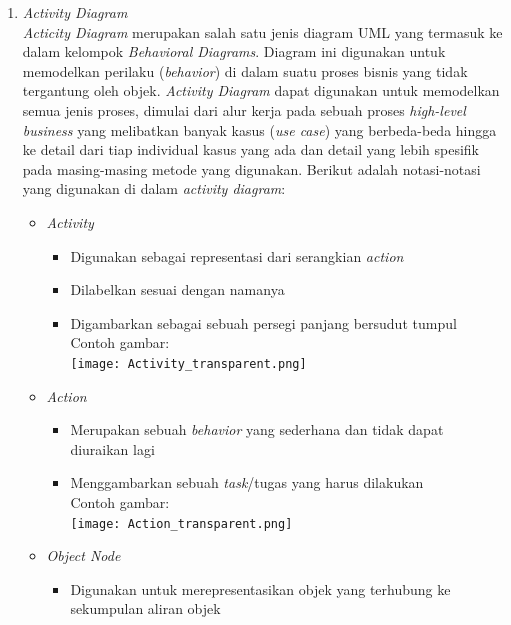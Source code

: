 \documentclass[a4paper]{article}
\begin{document}
\begin{enumerate}
    \item \textit{Activity Diagram}\\
    \textit{Acticity Diagram} merupakan salah satu jenis diagram UML yang termasuk ke dalam kelompok \textit{Behavioral Diagrams}. Diagram ini digunakan untuk memodelkan perilaku (\textit{behavior}) di dalam suatu proses bisnis yang tidak tergantung oleh objek. \textit{Activity Diagram} dapat digunakan untuk memodelkan semua jenis proses, dimulai dari alur kerja pada sebuah proses \textit{high-level business} yang melibatkan banyak kasus (\textit{use case}) yang berbeda-beda hingga ke detail dari tiap individual kasus yang ada dan detail yang lebih spesifik pada masing-masing metode yang digunakan\autocite{systemanalysisdesign-activity-diagram}. Berikut adalah notasi-notasi yang digunakan di dalam \textit{activity diagram}:
    \begin{itemize}
        \item \textit{Activity}
        \begin{itemize}
            \item Digunakan sebagai representasi dari serangkian \textit{action}
            \item Dilabelkan sesuai dengan namanya
            \item Digambarkan sebagai sebuah persegi panjang bersudut tumpul\autocite{systemanalysisdesign-activity-diagram}\\
                  Contoh gambar:\\
                  \texttt{[image: Activity\_transparent.png]}
        \end{itemize}
        \item \textit{Action}
        \begin{itemize}
            \item Merupakan sebuah \textit{behavior} yang sederhana dan tidak dapat diuraikan lagi
            \item Menggambarkan sebuah \textit{task}/tugas yang harus dilakukan\autocite{systemanalysisdesign-activity-diagram}\\
                  Contoh gambar:\\
                  \texttt{[image: Action\_transparent.png]}
        \end{itemize}
        \item \textit{Object Node}
        \begin{itemize}
            \item Digunakan untuk merepresentasikan objek yang terhubung ke sekumpulan aliran objek\autocite{systemanalysisdesign-activity-diagram}\\

\end{itemize}
\end{itemize}
\end{enumerate}
\end{document}

